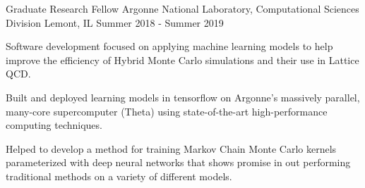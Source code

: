\vspace{-1.75ex}

\begin{cventries}

  \cventry
  {Graduate Research Fellow} %
  {Argonne National Laboratory, Computational Sciences Division} %
  {Lemont, IL} %
  {Summer 2018 - Summer 2019} %
  {
      \begin{cvitems} %
          \item {Software development focused on applying machine learning
                  models to help improve the efficiency of Hybrid Monte Carlo 
                  simulations and their use in Lattice QCD.}
          \item {Built and deployed learning models in tensorflow on Argonne's
                  massively parallel, many-core supercomputer (Theta) using
                  state-of-the-art high-performance computing techniques.}
          \item {Helped to develop a method for training Markov Chain Monte
                  Carlo kernels parameterized with deep neural networks that
                  shows promise in out performing traditional methods on a
                  variety of different models.}
      \end{cvitems}
  }


\end{cventries}
